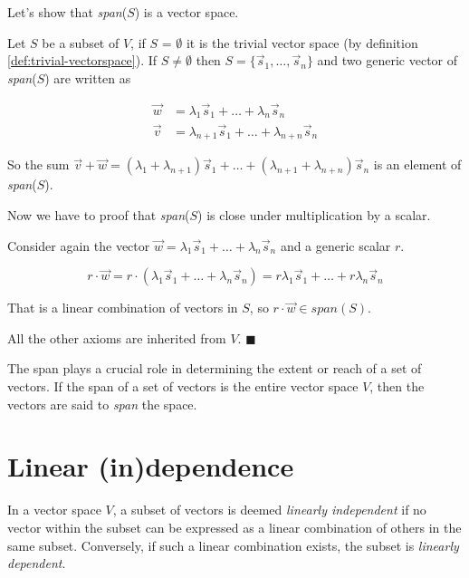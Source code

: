 \begin{tcolorbox}[colback=def_color,coltext=black,colframe=pro_color_back,title=\textbf{Proof},coltitle=black] Let's show that \textit{span}($S$) is a vector space. 

Let $S$ be a subset of $V$, if $S$ = $\emptyset$ it is the trivial vector space (by definition \ref{def:trivial-vectorspace}). If $S \neq \emptyset$ then $S = \{\vec s_1, \dots , \vec s_n\}$ and two generic vector of \textit{span}($S$) are written as 

\begin{align*}
\vec w &= \lambda_1 \vec s_1 + \dots + \lambda_n \vec s_n\\
\vec v &= \lambda_{n+1} \vec s_1 + \dots + \lambda_{n+n} \vec s_n
\end{align*}

So the sum $\vec v + \vec w = (\lambda_1 + \lambda_{n+1}) \vec s_1 + \dots + (\lambda_{n+1} + \lambda_{n+n}) \vec s_n$ is an element of \textit{span}($S$).

Now we have to proof that \textit{span}($S$) is close under multiplication by a scalar.

Consider again the vector $\vec w = \lambda_1 \vec s_1 + \dots + \lambda_n \vec s_n$ and a generic scalar $r$.

$$
r \cdot \vec w = r \cdot (\lambda_1 \vec s_1 + \dots + \lambda_n \vec s_n) = r\lambda_1 \vec s_1 + \dots + r\lambda_n \vec s_n
$$

That is a linear combination of vectors in $S$, so $r \cdot \vec w \in \textit{span}(S)$.

All the other axioms are inherited from $V$. $\blacksquare$

\end{tcolorbox}

The span plays a crucial role in determining the extent or reach of a set of vectors. If the span of a set of vectors is the entire vector space $V$, then the vectors are said to \emph{span} the space.
\section{Linear (in)dependence}

\begin{tcolorbox}[colback=def_color,colframe=gray] \begin{definition}
    In a vector space $V$, a subset of vectors is deemed \emph{linearly independent} if no vector within the subset can be expressed as a linear combination of others in the same subset. Conversely, if such a linear combination exists, the subset is \emph{linearly dependent}.
\end{definition}
\end{tcolorbox}

